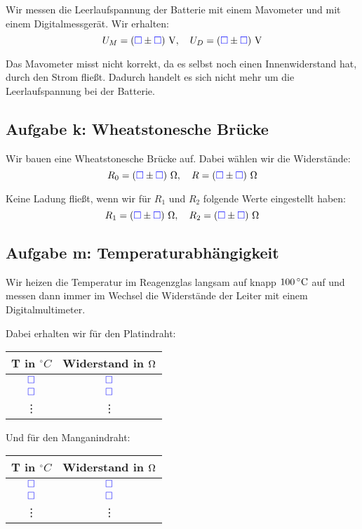 \documentclass[11pt,german]{article}
\newcommand{\messwert}{\textcolor{blue}{\square}}
\newcommand{\emesswert}{\left(\messwert \pm \messwert \right)}
\begin{document}
\label{durchführung-j}

Wir messen die Leerlaufspannung der Batterie mit einem Mavometer und mit einem
Digitalmessgerät. Wir erhalten:
\[ U_M = \unit[\emesswert] V, \quad U_D = \unit[\emesswert] V \]

Das Mavometer misst nicht korrekt, da es selbst noch einen Innenwiderstand hat,
durch den Strom fließt. Dadurch handelt es sich nicht mehr um die
Leerlaufspannung bei der Batterie.

\subsection{Aufgabe k: Wheatstonesche Brücke}

\label{durchführung-k}

Wir bauen eine Wheatstonesche Brücke auf. Dabei wählen wir die Widerstände:
\[
	R_0 = \unit[\emesswert] \Omega,
	\quad
	R = \unit[\emesswert] \Omega
\]

Keine Ladung fließt, wenn wir für $R_1$ und $R_2$ folgende Werte eingestellt haben:
\[
	R_1 = \unit[\emesswert] \Omega,
	\quad
	R_2 = \unit[\emesswert] \Omega
\]

\subsection{Aufgabe m: Temperaturabhängigkeit}

\label{durchführung-m}

Wir heizen die Temperatur im Reagenzglas langsam auf knapp $\unit[100]{^\circ C}$ auf und messen dann immer im Wechsel die Widerstände der Leiter mit einem Digitalmultimeter.

Dabei erhalten wir für den Platindraht:

\begin{center}
	\begin{tabular}{cc}
		T in $\unit{^\circ C}$ & Widerstand in $\unit \Omega$ \\
		\hline
		$\messwert$ & $\messwert$ \\
		$\messwert$ & $\messwert$ \\
		   \vdots & \vdots
	\end{tabular}
\end{center}

Und für den Manganindraht:

\begin{center}
	\begin{tabular}{cc}
		T in $\unit{^\circ C}$ & Widerstand in $\unit \Omega$ \\
		\hline
		$\messwert$ & $\messwert$ \\
		$\messwert$ & $\messwert$ \\
		   \vdots & \vdots
	\end{tabular}
\end{center}
\end{document}
